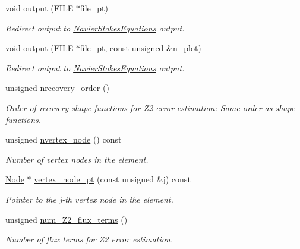 \begin{DoxyCompactItemize}
void \hyperlink{classoomph_1_1GeneralisedNewtonianTTaylorHoodElement_a4792f7006a06e705cf7d54c7933c1375}{output} (F\+I\+LE $\ast$file\+\_\+pt)
\begin{DoxyCompactList}\small\item\em Redirect output to \hyperlink{classoomph_1_1NavierStokesEquations}{Navier\+Stokes\+Equations} output. \end{DoxyCompactList}\item 
void \hyperlink{classoomph_1_1GeneralisedNewtonianTTaylorHoodElement_acc88cfe3517146492eff605648a22ee3}{output} (F\+I\+LE $\ast$file\+\_\+pt, const unsigned \&n\+\_\+plot)
\begin{DoxyCompactList}\small\item\em Redirect output to \hyperlink{classoomph_1_1NavierStokesEquations}{Navier\+Stokes\+Equations} output. \end{DoxyCompactList}\item 
unsigned \hyperlink{classoomph_1_1GeneralisedNewtonianTTaylorHoodElement_af02e0f6528abd5e17aceceb96811fe25}{nrecovery\+\_\+order} ()
\begin{DoxyCompactList}\small\item\em Order of recovery shape functions for Z2 error estimation\+: Same order as shape functions. \end{DoxyCompactList}\item 
unsigned \hyperlink{classoomph_1_1GeneralisedNewtonianTTaylorHoodElement_aa01c42f2e33c0fe78dfedceadd7ae78e}{nvertex\+\_\+node} () const
\begin{DoxyCompactList}\small\item\em Number of vertex nodes in the element. \end{DoxyCompactList}\item 
\hyperlink{classoomph_1_1Node}{Node} $\ast$ \hyperlink{classoomph_1_1GeneralisedNewtonianTTaylorHoodElement_a9de1770248ec1624dcb594f2116f7274}{vertex\+\_\+node\+\_\+pt} (const unsigned \&j) const
\begin{DoxyCompactList}\small\item\em Pointer to the j-\/th vertex node in the element. \end{DoxyCompactList}\item 
unsigned \hyperlink{classoomph_1_1GeneralisedNewtonianTTaylorHoodElement_af391b30468903ccd73ab58cbb3fff7c1}{num\+\_\+\+Z2\+\_\+flux\+\_\+terms} ()
\begin{DoxyCompactList}\small\item\em Number of \textquotesingle{}flux\textquotesingle{} terms for Z2 error estimation. \end{DoxyCompactList}\item 

\end{DoxyCompactItemize}
